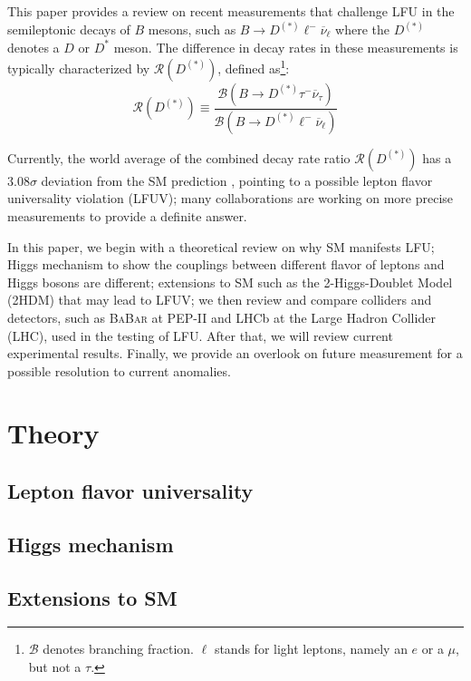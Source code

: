 \documentclass[12pt,letterpaper]{article}
\def\BaBar/{\textsc{BaBar}}
\def\RDDst/{\ensuremath{\mathcal{R}(D^{(*)})}}
\def\DDst/{\ensuremath{D^{(*)}}}
\def\Dst/{\ensuremath{D^*}}
\newcommand{\BMesonMode}[2]{\ensuremath{
    B \rightarrow #2 #1^- \overline{\nu}_#1
}}
\newcommand{\BDDstMode}[1]{\BMesonMode{#1}{\DDst/}}
\begin{document}
This paper provides a review on recent measurements that challenge LFU
in the semileptonic decays of $B$ mesons, such as
\BDDstMode{\ell} where the \DDst/ denotes a $D$ or \Dst/ meson.
The difference in decay rates in these measurements is typically characterized
by \RDDst/, defined as\footnote{
    $\mathcal{B}$ denotes branching fraction.
    $\ell$ stands for light leptons, namely an $e$ or a $\mu$, but not a $\tau$.
}:
\begin{equation}
    \RDDst/ \equiv \frac{
        \mathcal{B}\left( \BDDstMode{\tau} \right)
    }{
        \mathcal{B}\left( \BDDstMode{\ell} \right)
    }
\end{equation}

Currently, the world average of the combined decay rate ratio \RDDst/
has a $3.08\sigma$ deviation from the SM prediction \cite{HFLAV:2019}, pointing
to a possible lepton flavor universality violation (LFUV);
many collaborations are working on more precise measurements to provide a
definite answer.

In this paper, we begin with a theoretical review on why SM manifests LFU;
Higgs mechanism to show the couplings between different flavor of leptons and
Higgs bosons are different;
extensions to SM such as the 2-Higgs-Doublet Model (2HDM) that may lead to LFUV;
we then review and compare colliders and detectors, such as \BaBar/ at PEP-II
and LHCb at the Large Hadron Collider (LHC), used in the testing of LFU.
After that, we will review current experimental results.
Finally, we provide an overlook on future measurement for a possible resolution
to current anomalies.

\section{Theory}
\subsection{Lepton flavor universality} \label{sec:lfu}


\subsection{Higgs mechanism}


\subsection{Extensions to SM}

\end{document}

